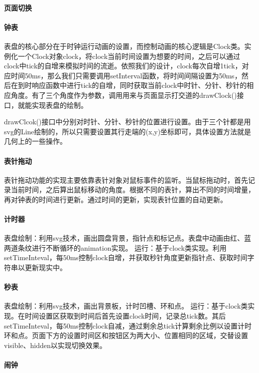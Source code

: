 \documentclass[UTF8]{ctexart}
\begin{document}
	\paragraph{页面切换}
	
	\paragraph{钟表}
	表盘的核心部分在于时钟运行动画的设置，而控制动画的核心逻辑是Clock类。实例化一个Clock对象clock，将clock当前时间设置为想要的时间，之后可以通过clock中tick的自增来模拟时间的流逝。依照我们的设计，clock每次自增1tick，对应时间50ms，那么我们只需要调用setInterval函数，将时间间隔设置为50ms，然后在到时响应函数中进行tick的自增，同时获取当前clock中时针、分针、秒针的相应角度。有了三个角度作为参数，调用用来与页面显示打交道的drawClock()接口，就能实现表盘的绘制。
	
	drawClcok()接口中分别对时针、分针、秒针的位置进行设置。由于三个针都是用svg的Line绘制的，所以只需要设置其行走端的(x,y)坐标即可，具体设置方法就是几何上的一些操作。
	
	\paragraph{表针拖动}
	表针拖动功能的实现主要依靠表针对象对鼠标事件的监听。当鼠标拖动时，首先记录当前时间，之后算出鼠标移动的角度。根据不同的表针，算出不同的时间增量，再对钟表的时间进行更新。通过时间的更新，实现表针位置的自动更新。
	
	\paragraph{计时器}
	表盘绘制：利用svg技术，画出圆盘背景，指针点和标记点。表盘中动画由红、蓝两道条纹进行不断循环的animation实现。
	运行：基于clock类实现。利用setTimeInteval，每50ms控制clock自增，并获取秒针角度更新指针点、获取时间字符串以更新现实中。
	\paragraph{秒表}
	表盘绘制：利用svg技术，画出背景板，计时凹槽、环和点。
	运行：基于clock类实现。在时间设置区获取到时间后首先设置clock时间，记录总tick数。其后setTimeInteval，每50ms控制clock自减，通过剩余总tick计算剩余比例以设置计时环和点。页面下方的设置时间区和按钮区为两大小、位置相同的区域，交替设置visible、hidden以实现切换效果。
	\paragraph{闹钟}
	
\end{document}
